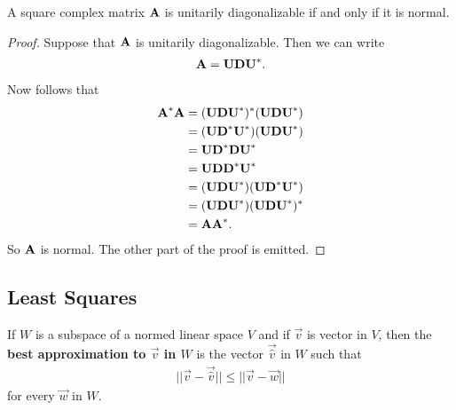 \documentclass{memoir}
\begin{document}
\begin{theorem}
    A square complex matrix $\mat{A}$ is unitarily diagonalizable if and only if it is normal.
\end{theorem}
\begin{proof}
    Suppose that $\mat{A}$ is unitarily diagonalizable. Then we can write
    \begin{align*}
        \mat{A} = \mat{U} \mat{D} \mat{U}^*.
    \end{align*}
    Now follows that
    \begin{align*}
        \mat{A}^* \mat{A} &= (\mat{U} \mat{D} \mat{U}^*)^* (\mat{U} \mat{D} \mat{U}^*) \\
        &= (\mat{U} \mat{D}^* \mat{U}^*) (\mat{U} \mat{D} \mat{U}^*) \\
        &= \mat{U} \mat{D}^* \mat{D} \mat{U}^* \\
        &= \mat{U} \mat{D} \mat{D}^* \mat{U}^* \\
        &= (\mat{U} \mat{D} \mat{U}^*) (\mat{U} \mat{D}^* \mat{U}^*) \\
        &= (\mat{U} \mat{D} \mat{U}^*) (\mat{U} \mat{D} \mat{U}^*)^* \\
        &= \mat{A} \mat{A}^*.
    \end{align*}
    So $\mat{A}$ is normal. The other part of the proof is emitted.
\end{proof}

\subsection{Least Squares}
\begin{definition}
    If $W$ is a subspace of a normed linear space $V$ and if $\vec{v}$ is vector in $V$, then the \textbf{best approximation to $\vec{v}$ in $W$} is the vector $\vec{\hat{v}}$ in $W$ such that
    \begin{align*}
        ||\vec{v} - \vec{\hat{v}}|| \le ||\vec{v} - \vec{w}||
    \end{align*}
    for every $\vec{w}$ in $W$.
\end{definition}
\end{document}
